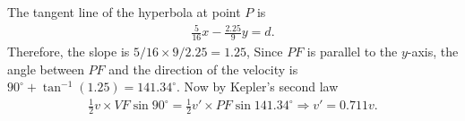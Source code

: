 \documentclass{article}
\begin{document}
\begin{enumerate}
  The tangent line of the hyperbola at point $P$ is
  \begin{align*}
    \frac{5}{16}x - \frac{2.25}{9}y = d.
  \end{align*}
  Therefore, the slope is $5/16\times 9/2.25 = 1.25$, Since $PF$ is parallel to the $y$-axis, the angle between $PF$ and the direction of the velocity is $90^\circ + \tan ^{-1}(1.25) = 141.34^\circ$. Now by Kepler's second law
  \begin{align*}
   \frac{1}{2}v\times VF \sin 90^\circ = \frac{1}{2} v' \times  PF \sin 141.34^\circ\Rightarrow v' = 0.711v.
  \end{align*}

   \begin{figure}[ht]
    \centering
  \end{figure}

  
\end{enumerate}
\end{document}
